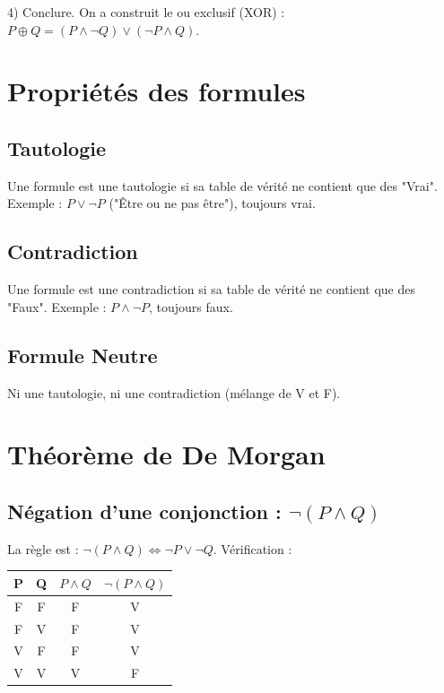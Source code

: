 \documentclass[a4paper,12pt]{article}
\begin{document}
4) Conclure.
On a construit le ou exclusif (XOR) : $P \oplus Q = (P \wedge \neg Q) \vee (\neg P \wedge Q)$.

\section{Propriétés des formules}
\subsection{Tautologie}
Une formule est une tautologie si sa table de vérité ne contient que des "Vrai".
Exemple : $P \vee \neg P$ ("Être ou ne pas être"), toujours vrai.

\subsection{Contradiction}
Une formule est une contradiction si sa table de vérité ne contient que des "Faux".
Exemple : $P \wedge \neg P$, toujours faux.

\subsection{Formule Neutre}
Ni une tautologie, ni une contradiction (mélange de V et F).

\newpage
\section{Théorème de De Morgan}

\subsection{Négation d'une conjonction : $\neg (P \wedge Q)$}
La règle est : $\neg (P \wedge Q) \iff \neg P \vee \neg Q$. Vérification :
\begin{center}
\begin{tabular}{|c|c|c|c|}
\hline
P & Q & $P \wedge Q$ & $\neg (P \wedge Q)$ \\
\hline
F & F & F & V \\
F & V & F & V \\
V & F & F & V \\
V & V & V & F \\
\hline
\end{tabular}
\end{center}
\end{document}
